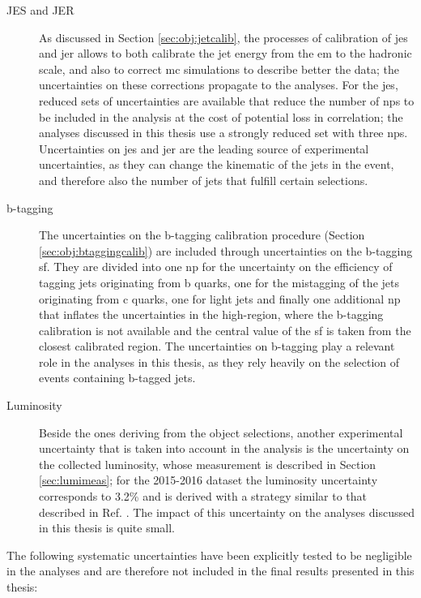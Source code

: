 \begin{description}

\item[JES and JER] As discussed in Section \ref{sec:obj:jetcalib}, the processes of calibration of \gls{jes} and \gls{jer} allows to both calibrate the jet energy from the \gls{em} to the
hadronic scale, and also to correct \gls{mc} simulations to describe better the data; the uncertainties on these corrections propagate to the analyses. 
For the \gls{jes}, reduced sets of uncertainties are available that reduce the number of \glspl{np} to be included in the analysis at the cost of potential loss in correlation; 
the analyses discussed in this thesis use a strongly reduced set with three \glspl{np}. 
Uncertainties on \gls{jes} and \gls{jer} are the leading source of experimental uncertainties, as they can change the kinematic of the jets in the event, and therefore also the number
of jets that fulfill certain selections.

\item[b-tagging] The uncertainties on the b-tagging calibration procedure (Section \ref{sec:obj:btaggingcalib}) are included through uncertainties on the b-tagging \gls{sf}. 
They are divided into one \gls{np} for the uncertainty on the efficiency of tagging jets originating from b quarks, one for the mistagging of the jets originating from 
c quarks, one for light jets and finally one additional \gls{np} that inflates the uncertainties in the high-\pt region, where the b-tagging calibration is not available and the central 
value of the \gls{sf} is taken from the closest calibrated \pt region. 
The uncertainties on b-tagging play a relevant role in the analyses in this thesis, as they rely heavily on the selection of events containing b-tagged jets.

\item[Luminosity] Beside the ones deriving from the object selections, another experimental uncertainty that is taken into account in the analysis is 
the uncertainty on the collected luminosity, whose measurement is described in Section \ref{sec:lumimeas}; for the 2015-2016 dataset the luminosity uncertainty corresponds 
to 3.2\% and is derived with a strategy similar to that described in Ref. \cite{Aaboud:2016hhf}. The impact of this uncertainty on the analyses discussed in this thesis is quite small.

\end{description}

\noindent The following systematic uncertainties have been explicitly tested to be negligible in the analyses and are therefore not included in the final results presented in this thesis:

